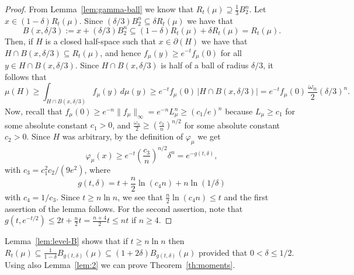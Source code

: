 \documentclass[11pt,leqno]{article}
\theoremstyle{definition}
\theoremstyle{remark}
\numberwithin{equation}{section}
\newcommand{\ls}{\leqslant}
\newcommand{\gr}{\geqslant}
\newcommand{\1}{\textbf{1}}
\begin{document}
\begin{proof}From Lemma~\ref{lem:gamma-ball} we know that $R_t(\mu)\supseteq \frac{1}{3}B_2^n$. Let $x\in (1-\delta)R_t(\mu)$.
Since $(\delta/3)B_2^n\subseteq \delta R_t(\mu)$ we have that
$$B(x,\delta/3):=x+(\delta/3)B_2^n\subseteq (1-\delta)R_t(\mu)+\delta R_t(\mu)=R_t(\mu).$$
Then, if $H$ is a closed half-space such that $x\in\partial(H)$ we have that $H\cap B(x,\delta/3)\subseteq R_t(\mu)$,
and hence $f_{\mu}(y)\gr e^{-t}f_{\mu}(0)$ for all $y\in H\cap B(x,\delta/3)$. Since $H\cap B(x,\delta/3)$
is half of a ball of radius $\delta/3$, it follows that
$$\mu(H)\gr \int_{H\cap B(x,\delta/3)}f_{\mu}(y)\,d\mu(y)\gr e^{-t}f_{\mu}(0)\,|H\cap B(x,\delta/3)|
=e^{-t}f_{\mu}(0)\,\frac{\omega_n}{2}(\delta/3)^n.$$
Now, recall that $f_{\mu}(0)\gr e^{-n}\|f_{\mu}\|_{\infty}=e^{-n}L_{\mu}^n\gr (c_1/e)^n$ because $L_{\mu}\gr c_1$
for some absolute constant $c_1>0$, and $\frac{\omega_n}{2}\gr \left(\frac{c_2}{n}\right)^{n/2}$ for some absolute
constant $c_2>0$. Since $H$ was arbitrary, by the definition of $\varphi_{\mu}$ we get
$$\varphi_{\mu}(x)\gr e^{-t}\left(\frac{c_3}{n}\right)^{n/2}\delta^n=e^{-g(t,\delta)},$$
with $c_3=c_1^2c_2/(9e^2)$, where
\begin{equation}\label{eq:delta}g(t,\delta)=t+\frac{n}{2}\ln(c_4n)+n\ln(1/\delta)\end{equation}
with $c_4=1/c_3$. Since $t\gr n\ln n$, we see that $\frac{n}{2}\ln(c_4n)\ls t$ and the first assertion of the lemma follows.
For the second assertion, note that $g(t,e^{-t/2})\ls 2t+\frac{n}{2}t=\frac{n+4}{2}t\ls nt$ if $n\gr 4$.
\end{proof}

Lemma~\ref{lem:level-B} shows that if $t\gr n\ln n$ then $R_t(\mu)\subseteq \frac{1}{1-\delta}B_{g(t,\delta)}(\mu)
\subseteq (1+2\delta)B_{g(t,\delta)}(\mu)$ provided that $0<\delta \ls 1/2$. Using also Lemma~\ref{lem:2} we can
prove Theorem~\ref{th:moments}.
\end{document}
